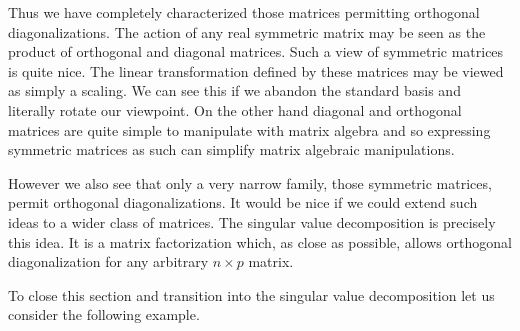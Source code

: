 \documentclass{book}
\begin{document}
Thus we have completely characterized those matrices permitting orthogonal diagonalizations. The action of any real symmetric matrix may be seen as the product of orthogonal and diagonal matrices. Such a view of symmetric matrices is quite nice. The linear transformation defined by these matrices may be viewed as simply a scaling. We can see this if we abandon the standard basis and literally rotate our viewpoint. On the other hand diagonal and orthogonal matrices are quite simple to manipulate with matrix algebra and so expressing symmetric matrices as such can simplify matrix algebraic manipulations. 

However we also see that only a very narrow family, those symmetric matrices, permit orthogonal diagonalizations. It would be nice if we could extend such ideas to a wider class of matrices. The singular value decomposition is precisely this idea. It is a matrix factorization which, as close as possible, allows orthogonal diagonalization for any arbitrary $n \times p$ matrix. 

To close this section and transition into the singular value decomposition let us consider the following example.
\end{document}
